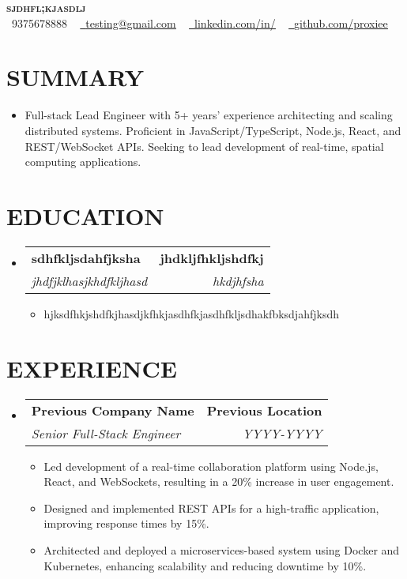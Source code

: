 \documentclass[letterpaper,11pt]{article}
\makeatletter
\newcommand{\resumeItem}[1]{\item\small{{#1 \vspace{-3pt}}}}
\newcommand{\resumeSubheading}[4]{\vspace{-2pt}\item\begin{tabular*}{0.97\textwidth}[t]{l@{\extracolsep{\fill}}r}\textbf{#1} & #2 \\\textit{\small#3} & \textit{\small #4} \\\end{tabular*}\vspace{-7pt}}
\newcommand{\resumeSubHeadingListStart}{\begin{itemize}[leftmargin=0.15in, label={}]}
\newcommand{\resumeSubHeadingListEnd}{\end{itemize}}
\newcommand{\resumeItemListStart}{\begin{itemize}}
\newcommand{\resumeItemListEnd}{\end{itemize}\vspace{-5pt}}
\makeatother
\begin{document}
\begin{center}
    \textbf{\Huge \scshape {\fontsize{15pt}{20pt}\selectfont sjdhfl;kjasdlj}} \\ \vspace{1pt}
    \small \raisebox{-0.1\height}\faPhone\ 9375678888 ~ \href{mailto:testing@gmail.com}{\raisebox{-0.2\height}\faEnvelope\  \underline{testing@gmail.com}} ~ 
    \href{https://www.linkedin.com/feed/}{\raisebox{-0.2\height}\faLinkedin\ \underline{linkedin.com/in/}} ~ 
    \href{https://github.com/proxiee}{\raisebox{-0.2\height}\faGithub\ \underline{github.com/proxiee}}
    \vspace{-8pt}
\end{center}

\section{{\fontsize{9pt}{20pt}\selectfont \textbf{SUMMARY}}}\resumeSubHeadingListStart
\resumeItem{Full-stack Lead Engineer with 5+ years' experience architecting and scaling distributed systems.  Proficient in JavaScript/TypeScript, Node.js, React, and REST/WebSocket APIs.  Seeking to lead development of real-time, spatial computing applications.}
\resumeSubHeadingListEnd\vspace{-18pt}
\section{{\fontsize{9pt}{20pt}\selectfont \textbf{EDUCATION}}}\resumeSubHeadingListStart
\resumeSubheading{sdhfkljsdahfjksha}{\textbf{jhdkljfhkljshdfkj}}{jhdfjklhasjkhdfkljhasd}{hkdjhfsha}
\resumeItemListStart
\resumeItem{hjksdfhkjshdfkjhasdjkfhkjasdhfkjasdhfkljsdhakfbksdjahfjksdh}
\resumeItemListEnd
\resumeSubHeadingListEnd\vspace{-18pt}
\section{{\fontsize{9pt}{20pt}\selectfont \textbf{EXPERIENCE}}}\resumeSubHeadingListStart
\resumeSubheading{Previous Company Name}{\textbf{Previous Location}}{Senior Full-Stack Engineer}{YYYY-YYYY}
\resumeItemListStart
\resumeItem{Led development of a real-time collaboration platform using Node.js, React, and WebSockets, resulting in a 20\% increase in user engagement.}
\resumeItem{Designed and implemented REST APIs for a high-traffic application, improving response times by 15\%.}
\resumeItem{Architected and deployed a microservices-based system using Docker and Kubernetes, enhancing scalability and reducing downtime by 10\%.}
\resumeItemListEnd
\resumeSubHeadingListEnd\vspace{-17pt}
\end{document}
